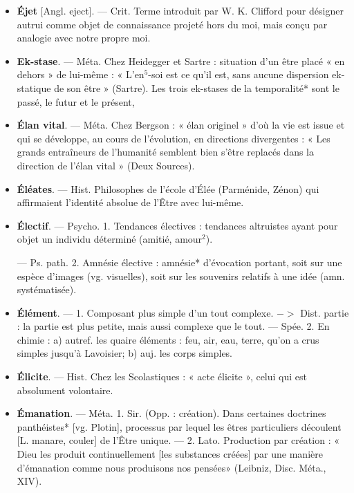 \begin{itemize}[leftmargin=1cm, label=, itemsep=1pt]
\item {\bf Éjet} [Angl. eject]. — Crit. Terme introduit par W. K. Clifford pour désigner autrui comme objet de connaissance projeté hors du moi, mais
conçu par analogie avec notre
propre moi.

\item {\bf Ek-stase}. — Méta. Chez Heidegger
et Sartre : situation d’un être placé
« en dehors » de lui-même : « L’en$^5$-soi est ce qu'il est, sans aucune dispersion ek-statique de son être »
(Sartre). Les trois ek-stases de la
temporalité* sont le passé, le futur
et le présent,

\item {\bf Élan vital}. — Méta. Chez Bergson :
« élan originel » d’où la vie est issue
et qui se développe, au cours de
l'évolution, en directions divergentes : « Les grands entraîneurs de
l'humanité semblent bien s'être
replacés dans la direction de l'élan
vital » (Deux Sources).

\item {\bf Éléates}. — Hist. Philosophes de l’école
d’Élée (Parménide, Zénon) qui
affirmaient l'identité absolue de
l'Être avec lui-même.

\item {\bf Électif}. — Psycho. 1. Tendances électives : tendances altruistes ayant
pour objet un individu déterminé
(amitié, amour$^2$).

— Ps. path. 2. Amnésie élective :
amnésie* d’évocation portant, soit
sur une espèce d'images (vg. visuelles), soit sur les souvenirs relatifs
à une idée (amn. systématisée).

\item {\bf Élément}. — 1. Composant plus simple
d'un tout complexe. $->$ Dist.
partie : la partie est plus petite,
mais aussi complexe que le tout. —
Spée. 2. En chimie : a) autref. les
quaire éléments : feu, air, eau, terre,
qu’on a crus simples jusqu’à Lavoisier; b) auj. les corps simples.

\item {\bf Élicite}. — Hist. Chez les Scolastiques :
« acte élicite », celui qui est absolument volontaire.

\item {\bf Émanation}. — Méta. 1. Sir. (Opp. :
création). Dans certaines doctrines
panthéistes* [vg. Plotin], processus
par lequel les êtres particuliers
découlent [L. manare, couler] de
l'Être unique. — 2. Lato. Production par création : « Dieu les produit
continuellement [les substances
créées] par une manière d'émanation comme nous produisons nos
pensées» (Leibniz, Disc. Méta., XIV).


\end{itemize}
